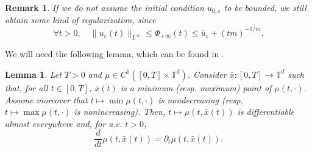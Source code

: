 \documentclass[11pt]{article}
\newtheorem{lemma}[thm]{Lemma}
\newtheorem{remark}[thm]{Remark}
\numberwithin{equation}{section} %
\newcommand{\p}{{\partial}}
\newcommand{\T}{{\mathbb{T}}}
\newcommand{\ep}{\varepsilon}
\def \ep{\varepsilon}
\begin{document}
\begin{remark}
    If we do not assume the initial condition $u_{0,\ep}$ to be bounded, we still obtain some kind of regularization, since 
    \begin{equation*}
        \forall t> 0, \quad \|u_\ep(t) \|_{L^\infty} \le \Phi_{+\infty}(t) \le \bar u_\ep + (tm)^{-1/m}.
    \end{equation*}
\end{remark}
We will need the following lemma, which can be found in \cite[Lemma 2.5]{ACDC25}.
\begin{lemma}\label{lem:mincurve}
    Let $T>0$ and $\mu\in C^1( [0,T]\times \T^d)$. Consider $\bar x: [0,T]\to \T^d$ such that, for all $t\in [0, T]$, $\bar x(t)$ is a minimum (resp. maximum) point of $\mu(t,\cdot)$. Assume moreover that $t\mapsto \min \mu(t,\cdot)$ is nondecreasing (resp. $t\mapsto \max \mu(t,\cdot)$ is nonincreasing). Then, $t\mapsto \mu(t,\bar x(t))$ is differentiable almost everywhere and, for a.e. $t>0$,
    \begin{equation*}
        \frac{d}{dt}\mu(t,\bar x(t)) = \p_t \mu(t, \bar x(t)).
    \end{equation*}
\end{lemma}
\end{document}
